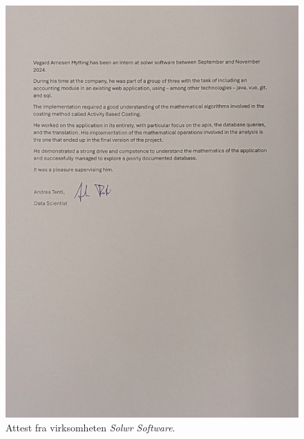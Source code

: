 \begin{figure}[H]
\centering
\includegraphics[width=0.9\linewidth]{resources/attest_solwr.jpg}
\caption{\label{fig:downloads}Attest fra virksomheten \textit{Solwr Software}.}
\end{figure}